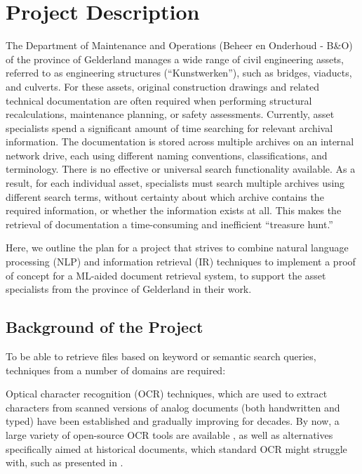 \section{Project Description}

The Department of Maintenance and Operations (Beheer en Onderhoud - B\&O) of the province of Gelderland manages a wide range of civil engineering assets, referred to as engineering structures (“Kunstwerken”), such as bridges, viaducts, and culverts. 
For these assets, original construction drawings and related technical documentation are often required when performing structural recalculations, maintenance planning, or safety assessments. 
Currently, asset specialists spend a significant amount of time searching for relevant archival information. 
The documentation is stored across multiple archives on an internal network drive, each using different naming conventions, classifications, and terminology. 
There is no effective or universal search functionality available.
As a result, for each individual asset, specialists must search multiple archives using different search terms, without certainty about which archive contains the required information, or whether the information exists at all. 
This makes the retrieval of documentation a time-consuming and inefficient “treasure hunt.”  


Here, we outline the plan for a project that strives to combine natural language processing (NLP) and information retrieval (IR) techniques to implement a proof of concept for a ML-aided document retrieval system, to support the asset specialists from the province of Gelderland in their work.


\subsection{Background of the Project}

To be able to retrieve files based on keyword or semantic search queries, techniques from a number of domains are required: 

Optical character recognition (OCR) techniques, which are used to extract characters from scanned versions of analog documents (both handwritten and typed) have been established and gradually improving for decades.
By now, a large variety of open-source OCR tools are available \cite{nazeemOpenSourceOCRLibraries2024}, as well as alternatives specifically aimed at historical documents, which standard OCR might struggle with, such as presented in \textcite{nguyenSurveyPostOCRProcessing2021}.

